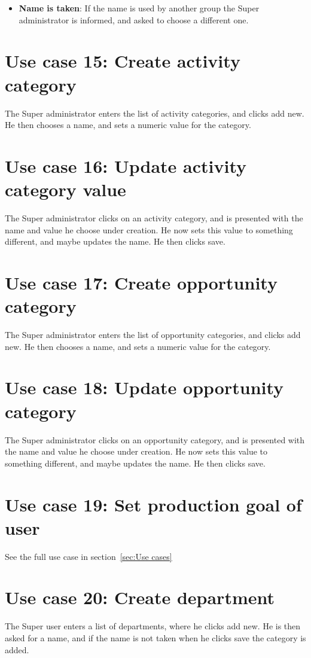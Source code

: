 \begin{itemize}
  \item \textbf{Name is taken}: If the name is used by another group the Super
    administrator is informed, and asked to choose a different one. 
\end{itemize}

\section{Use case 15: Create activity category }
The Super administrator enters the list of activity categories, and clicks add
new. He then chooses a name, and sets a numeric value for the category. 

\section{Use case 16: Update activity category value }
The Super administrator clicks on an activity category, and is presented with
the name and value he choose under creation. He now sets this value to something
different, and maybe updates the name. He then clicks save. 

\section{Use case 17: Create opportunity category }
The Super administrator enters the list of opportunity categories, and clicks
add new. He then chooses a name, and sets a numeric value for the category. 


\section{Use case 18: Update opportunity category }
The Super administrator clicks on an opportunity category, and is presented with
the name and value he choose under creation. He now sets this value to something
different, and maybe updates the name. He then clicks save. 

\section{Use case 19: Set production goal of user }
See the full use case in section~\ref{sec:Use cases}

\section{Use case 20: Create department }
The Super user enters a list of departments, where he clicks add new. He is then
asked for a name, and if the name is not taken when he clicks save the category
is added. 

